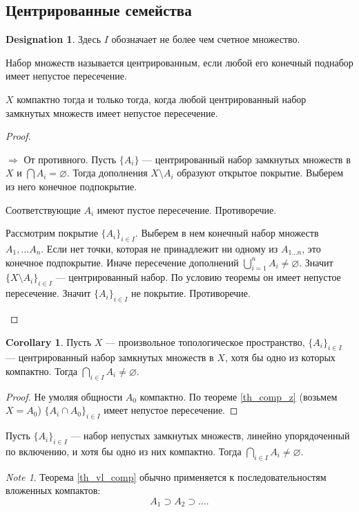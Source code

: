 \documentclass[11pt]{book}
\theoremstyle{definition}
\theoremstyle{plain}
\theoremstyle{plain}
\theoremstyle{definition}
\newtheorem*{cor}{Corollary}
\newtheorem*{name}{Designation}
\theoremstyle{remark}
\newtheorem*{note}{Note}
\begin{document}
\subsection{Центрированные семейства}
\begin{name}
    Здесь $ I$ обозначает не более чем счетное множество.
\end{name}
\begin{defn}
    Набор множеств называется  центрированным, если любой его конечный поднабор имеет непустое пересечение.
\end{defn}
\begin{thm}\label{th_comp_z}
    $ X$ компактно тогда и только тогда, когда любой центрированный набор замкнутых множеств имеет непустое пересечение.
\end{thm}
\begin{proof}
$ $
\begin{description}
    \item $ \boxed{ \Longrightarrow }$ От противного. Пусть $ \{A_i\}$ --- центрированный набор замкнутых множеств в $ X$ и  $ \bigcap A_i= \varnothing $. Тогда дополнения $ X \setminus A_i$ образуют открытое покрытие. Выберем из него конечное подпокрытие.

	Соответствующие $ A_i$ имеют пустое пересечение.  Противоречие. 
    \item \boxed {\Longrightarrow} Рассмотрим покрытие $ \{A_i\}_{i \in I}$. Выберем в нем конечный набор множеств $ A_1, \ldots A_n$. Если нет точки, которая не принадлежит ни одному из $ A_{1 \ldots  n}$, это конечное подпокрытие. Иначе пересечение дополнений $ \bigcup_{i=1}^{n} A_i \ne \varnothing$. Значит $ \{X \setminus A_i\}_{i \in I}$ --- центрированный набор. По условию теоремы он имеет непустое пересечение. Значит $ \{A_i\}_{i \in I} $ не покрытие. Противоречие.  
\end{description}
\end{proof}
\begin{cor}
    Пусть $ X$ --- произвольное  топологическое пространство, $ \{A_i\}_{i \in I}$ --- центрированный набор замкнутых множеств в $ X$, хотя бы одно из которых компактно. 
    Тогда  $ \bigcap_{i \in  I} A_i \ne \varnothing$.
\end{cor}
\begin{proof}
    Не умоляя общности $ A_0$ компактно. По теореме \ref{th_comp_z} (возьмем $ X=A_0$)  $ \{A_i \cap A_0\}_{i \in  I}$ имеет непустое пересечение.
\end{proof}
\begin{thm}\label{th_vl_comp}
    Пусть $ \{A_i\}_{i \in  I}$ --- набор непустых замкнутых множеств, линейно упорядоченный по включению, и хотя бы одно из них компактно. 
    Тогда $ \bigcap_{i \in  I} A_i \ne \varnothing $.
\end{thm}
\begin{note}
    Теорема \ref{th_vl_comp} обычно применяется к последовательностям вложенных компактов:
    \[
    A_1 \supset A_2 \supset \ldots 
    .\] 
\end{note}
\end{document}

